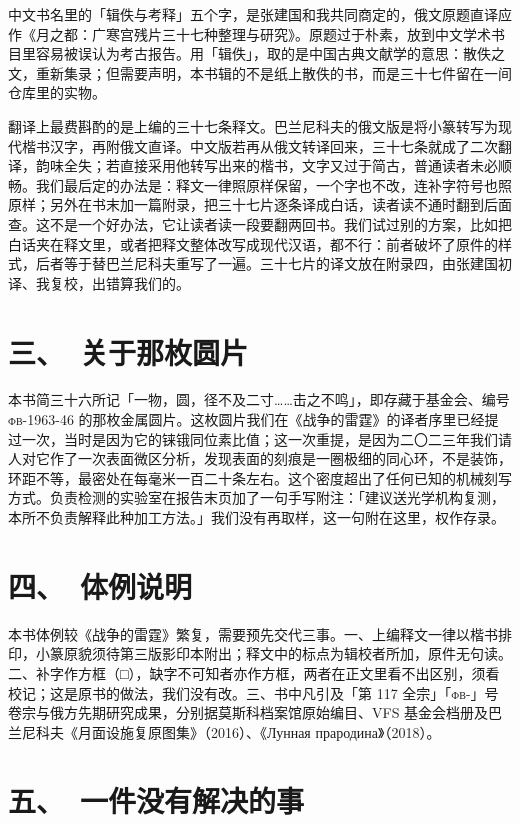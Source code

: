 中文书名里的「辑佚与考释」五个字，是张建国和我共同商定的，俄文原题直译应作《月之都：广寒宫残片三十七种整理与研究》。原题过于朴素，放到中文学术书目里容易被误认为考古报告。用「辑佚」，取的是中国古典文献学的意思：散佚之文，重新集录；但需要声明，本书辑的不是纸上散佚的书，而是三十七件留在一间仓库里的实物。

翻译上最费斟酌的是上编的三十七条释文。巴兰尼科夫的俄文版是将小篆转写为现代楷书汉字，再附俄文直译。中文版若再从俄文转译回来，三十七条就成了二次翻译，韵味全失；若直接采用他转写出来的楷书，文字又过于简古，普通读者未必顺畅。我们最后定的办法是：释文一律照原样保留，一个字也不改，连补字符号也照原样；另外在书末加一篇附录，把三十七片逐条译成白话，读者读不通时翻到后面查。这不是一个好办法，它让读者读一段要翻两回书。我们试过别的方案，比如把白话夹在释文里，或者把释文整体改写成现代汉语，都不行：前者破坏了原件的样式，后者等于替巴兰尼科夫重写了一遍。三十七片的译文放在附录四，由张建国初译、我复校，出错算我们的。

\section*{三、\ 关于那枚圆片}

本书简三十六所记「一物，圆，径不及二寸……击之不鸣」，即存藏于基金会、编号 \textsc{фв}-1963-46 的那枚金属圆片。这枚圆片我们在《战争的雷霆》的译者序里已经提过一次，当时是因为它的铼锇同位素比值；这一次重提，是因为二〇二三年我们请人对它作了一次表面微区分析，发现表面的刻痕是一圈极细的同心环，不是装饰，环距不等，最密处在每毫米一百二十条左右。这个密度超出了任何已知的机械刻写方式。负责检测的实验室在报告末页加了一句手写附注：「建议送光学机构复测，本所不负责解释此种加工方法。」我们没有再取样，这一句附在这里，权作存录。

\section*{四、\ 体例说明}

本书体例较《战争的雷霆》繁复，需要预先交代三事。一、上编释文一律以楷书排印，小篆原貌须待第三版影印本附出；释文中的标点为辑校者所加，原件无句读。二、补字作方框（□），缺字不可知者亦作方框，两者在正文里看不出区别，须看校记；这是原书的做法，我们没有改。三、书中凡引及「第 117 全宗」「\textsc{фв}-」号卷宗与俄方先期研究成果，分别据莫斯科档案馆原始编目、VFS 基金会档册及巴兰尼科夫《月面设施复原图集》（2016）、《Лунная прародина》（2018）。

\section*{五、\ 一件没有解决的事}

